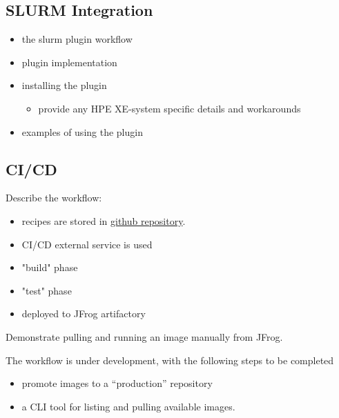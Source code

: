 \subsection{SLURM Integration}


\begin{itemize}
    \item the slurm plugin workflow
    \item plugin implementation
    \item installing the plugin
    \begin{itemize}
        \item provide any HPE XE-system specific details and workarounds
    \end{itemize}
    \item examples of using the plugin
\end{itemize}

\subsection{CI/CD}


Describe the workflow:
\begin{itemize}
    \item recipes are stored in \href{https://github.com/eth-cscs/alps-spack-stacks}{github repository}.
    \item CI/CD external service is used
    \item "build" phase
    \item "test" phase
    \item deployed to JFrog artifactory
\end{itemize}

Demonstrate pulling and running an image manually from JFrog.

The workflow is under development, with the following steps to be completed
\begin{itemize}
    \item promote images to a ``production'' repository
    \item a CLI tool for listing and pulling available images.
\end{itemize}

